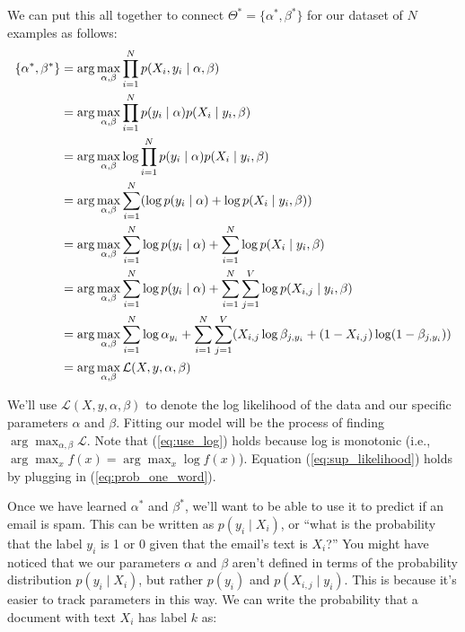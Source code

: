 \documentclass[12pt]{article}
\begin{document}
We can put this all together to connect $\Theta^* = \{\alpha^*, \beta^*\}$
for our dataset of $N$ examples as follows:
\begin{align}
\{\alpha^*, \beta^*\}
&= \arg\max_{\alpha, \beta} \prod_{i=1}^N p(X_i, y_i \mid \alpha, \beta) \nonumber \\
&= \arg\max_{\alpha, \beta} \prod_{i=1}^N p(y_i \mid \alpha)p(X_i \mid y_i, \beta) \nonumber \\
&= \arg\max_{\alpha, \beta} \log\prod_{i=1}^N p(y_i \mid \alpha)p(X_i \mid y_i, \beta)
\label{eq:use_log}\\
&= \arg\max_{\alpha, \beta} \sum_{i=1}^N \Large(\log p(y_i \mid \alpha) + \log p(X_i \mid y_i, \beta)\Large) \nonumber \\
&= \arg\max_{\alpha, \beta} \sum_{i=1}^N \log p(y_i \mid \alpha) 
  + \sum_{i=1}^N \log p(X_i \mid y_i, \beta) \nonumber \\
&= \arg\max_{\alpha, \beta} \sum_{i=1}^N \log p(y_i \mid \alpha) 
  + \sum_{i=1}^N \sum_{j=1}^V \log p(X_{i, j} \mid y_i, \beta) \nonumber \\
&= \arg\max_{\alpha, \beta} \sum_{i=1}^N \log \alpha_{y_i}
  + \sum_{i=1}^N \sum_{j=1}^V \Huge(X_{i, j} \log \beta_{j, y_i} + (1 - X_{i, j})
  \log (1 - \beta_{j, y_i})\Huge) \label{eq:sup_likelihood} \\
&= \arg\max_{\alpha, \beta} {\mathcal L}(X, y, \alpha, \beta) \nonumber
\end{align}

We'll use ${\mathcal L}(X, y, \alpha, \beta)$ to denote the log likelihood of
the data and our specific parameters $\alpha$ and $\beta$. Fitting our model
will be the process of finding $\arg\max_{\alpha, \beta} {\mathcal L}$.  Note
that (\ref{eq:use_log}) holds because log is monotonic (i.e., $\arg \max_x f(x)
= \arg \max_x \log f(x)$). Equation (\ref{eq:sup_likelihood}) holds by plugging
in (\ref{eq:prob_one_word}).

Once we have learned $\alpha^*$ and $\beta^*$, we'll want to be able to use it
to predict if an email is spam. This can be written as $p(y_i \mid X_i)$, or
``what is the probability that the label $y_i$ is 1 or 0 given that the email's
text is $X_i$?'' You might have noticed that we our parameters $\alpha$ and
$\beta$ aren't defined in terms of the probability distribution $p(y_i \mid
X_i)$, but rather $p(y_i)$ and $p(X_{i,j} \mid y_i)$. This is because it's
easier to track parameters in this way. We can write the probability that a
document with text $X_i$ has label $k$ as:
\end{document}
